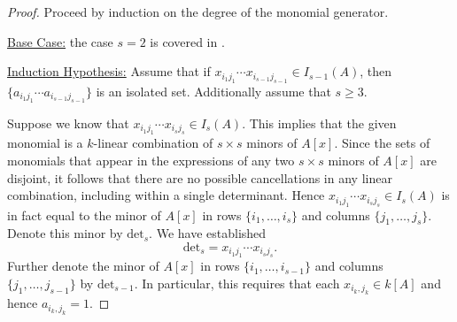 \documentclass[10pt,a4paper]{amsart}
\theoremstyle{plain}
\theoremstyle{definition}
\begin{document}
\begin{proof}
Proceed by induction on the degree of the monomial generator. 

\noindent \underline{Base Case:} the case $s=2$ is covered in .

\noindent \underline{Induction Hypothesis:} Assume that if $x_{i_1 j_1}\cdots x_{i_{s-1}j_{s-1}}\in I_{s-1}(A)$, then $\{a_{i_1 j_1}\cdots a_{i_{s-1}j_{s-1}}\}$ is an isolated set. Additionally assume that $s\geq 3$.

Suppose we know that $x_{i_1 j_1}\cdots x_{i_sj_s}\in I_s(A)$. This implies that the given monomial is a $k$-linear combination of $s\times s$ minors of $A[x]$. Since the sets of monomials that appear in the expressions of any two $s\times s$ minors of $A[x]$ are disjoint, it follows that there are no possible cancellations in any linear combination, including within a single determinant. Hence $x_{i_1 j_1}\cdots x_{i_sj_s}\in I_s(A)$ is in fact equal to the minor of $A[x]$ in rows $\{i_1, \ldots, i_s\}$ and columns $\{j_1, \ldots, j_s\}$. Denote this minor by $\text{det}_s$. 
We have established
\[
\text{det}_s = x_{i_1 j_1}\cdots x_{i_sj_s}.
\]
Further denote the minor of $A[x]$ in rows $\{i_1, \ldots, i_{s-1}\}$ and columns $\{j_1, \ldots, j_{s-1}\}$ by $\text{det}_{s-1}$.
In particular, this requires that each $x_{i_k,j_k} \in k[A]$ and hence $a_{i_k,j_k}=1$.


\end{proof}
\end{document}
